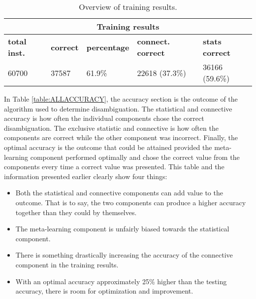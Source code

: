 \begin{table}[htpb]
	\centering 
	\begin{tabular}{|l|l|l|l|l|}
		\hline
			\multicolumn{5}{|c|}{\bf Training results } \\
		\hline
		{\bf total inst.} & {\bf correct } & {\bf percentage} & {\bf connect. correct } & {\bf stats correct } \\ \hline 
		60700				  & 37587		   & 61.9\%		  & 22618 (37.3\%)				  & 36166 (59.6\%)   \\ \hline 
	\end{tabular}
	\caption{Overview of training results. \label{table:TRAININGRESULTS}}
\end{table}

In Table \ref{table:ALLACCURACY}, the accuracy section is the outcome of the
algorithm used to determine disambiguation. The statistical and connective
accuracy is how often the individual components chose the correct
disambiguation.  The exclusive statistic and connective is how often the
components are correct while the other component was incorrect.  Finally, the
optimal accuracy is the outcome that could be attained provided the meta-learning component performed optimally and chose the correct value from the
components every time a correct value was presented. This table and the
information presented earlier clearly show four things: 
\begin{itemize}
	\item Both the statistical and connective components can add value to the 
	outcome. That is to say, the two components can produce a higher accuracy 
	together than they could by themselves.     
	\item The meta-learning component is unfairly biased towards the statistical
	component.     
	\item There is something drastically increasing the accuracy of the connective component in the training results.
	\item With an optimal accuracy approximately 25\% higher than the testing accuracy, there is room for optimization and improvement. 
\end{itemize}

